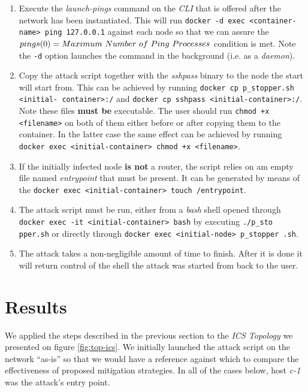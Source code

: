         \begin{enumerate}
            \item Execute the \textit{launch-pings} command on the \textit{CLI} that is offered after the network has been instantiated. This will run \texttt{docker -d exec <container-name> ping 127.0.0.1} against each node so that we can assure the $pings(0) = Maximum\ Num\- \allowbreak ber\ of\ Ping\ Processes$ condition is met. Note the \texttt{-d} option launches the command in the background (i.e. as a \textit{daemon}).
            \item Copy the attack script together with the \textit{sshpass} binary to the node the start will start from. This can be achieved by running \texttt{docker cp p\_stopper.sh <initial- \allowbreak container>:/} and \texttt{docker cp sshpass <initial-container>:/}. Note these files \textbf{must be} executable. The user should run \texttt{chmod +x <filename>} on both of them either before or after copying them to the container. In the latter case the same effect can be achieved by running \texttt{docker exec <initial-container> chmod +x <filename>}.
            \item If the initially infected node \textbf{is not} a router, the script relies on am empty file named \textit{entrypoint} that must be present. It can be generated by means of the \texttt{docker exec <initial-container> touch /entrypoint}.
            \item The attack script must be run, either from a \textit{bash} shell opened through \texttt{docker exec -it <initial-container> bash} by executing \texttt{./p\_sto pper.sh} or directly through \texttt{docker exec <initial-node> p\_stopper .sh}.
            \item The attack takes a non-negligible amount of time to finish. After it is done it will return control of the shell the attack was started from back to the user.
        \end{enumerate}

    \section{Results}
        We applied the steps described in the previous section to the \textit{ICS Topology} we presented on figure \ref{fig:top-ics}. We initially launched the attack script on the network ``as-is'' so that we would have a reference against which to compare the effectiveness of proposed mitigation strategies. In all of the cases below, host \textit{c-1} was the attack's entry point.\\

